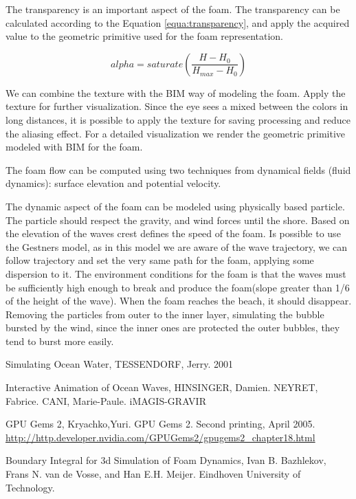 \documentclass{report}
\begin{document}
The transparency is an important aspect of the foam. The transparency
can be calculated\cite{nvidia} according to the Equation
\ref{equa:transparency}, and apply the acquired value to the geometric
primitive used for the foam representation.

\begin{equation} alpha=saturate(\frac{H-H_0}{H_{max} - H_0})
  \label{equa:transparency} \end{equation}

We can combine the texture with the BIM way of modeling the foam. Apply
the texture for further visualization. Since the eye sees a mixed
between the colors in long distances, it is possible to apply the
texture for saving processing and reduce the aliasing effect.  For a
detailed visualization we render the geometric primitive modeled with
BIM for the foam.

The foam flow can be computed using two techniques from dynamical fields (fluid dynamics): surface elevation and potential velocity.

The dynamic aspect of the foam can be modeled using physically based particle. The particle should respect the gravity, and wind forces until the shore. Based on the elevation of the waves crest defines the speed of the foam. Is possible to use the Gestners model, as in this model we are aware of the wave trajectory, we can follow trajectory and set the very same path for the foam, applying some dispersion to it\cite{iaow}.
The environment conditions for the foam is that the waves must be sufficiently high enough to break and produce the foam(slope greater than 1/6 \cite{sow} of the height of the wave).
When the foam reaches the beach, it should disappear. Removing the particles from outer to the inner layer, simulating the bubble bursted by the wind, since the inner ones are protected the outer bubbles, they tend to burst more easily.


\begin{thebibliography}{9}

    Simulating Ocean Water,
    TESSENDORF, Jerry.
    2001

    Interactive Animation of Ocean Waves,
    HINSINGER, Damien. NEYRET, Fabrice. CANI, Marie-Paule.
    iMAGIS-GRAVIR

    GPU Gems 2,
    Kryachko,Yuri.
    GPU Gems 2. 
    Second printing, April 2005.
    \url{http://http.developer.nvidia.com/GPUGems2/gpugems2_chapter18.html}

    Boundary Integral for 3d Simulation of Foam Dynamics,
    Ivan B. Bazhlekov, Frans N. van de Vosse, and Han E.H. Meijer.
    Eindhoven University of Technology.

\end{thebibliography}
\end{document}
